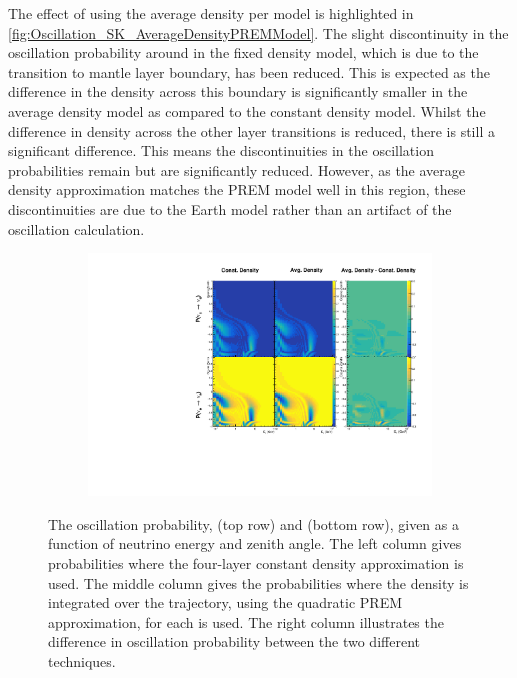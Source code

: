 The effect of using the average density per  model is highlighted in \autoref{fig:Oscillation_SK_AverageDensityPREMModel}. The slight discontinuity in the oscillation probability around  in the fixed density model, which is due to the transition to mantle layer boundary, has been reduced. This is expected as the difference in the density across this boundary is significantly smaller in the average density model as compared to the constant density model. Whilst the difference in density across the other layer transitions is reduced, there is still a significant difference. This means the discontinuities in the oscillation probabilities remain but are significantly reduced. However, as the average density approximation matches the PREM model well in this region, these discontinuities are due to the Earth model rather than an artifact of the oscillation calculation.

\begin{figure}[h]
  \begin{subfigure}[t]{\textwidth}
    \includegraphics[width=\textwidth, trim={0mm 0mm 0mm 0mm}, clip,page=1]{Figures/Oscillation/AverageDensityPREMModel.pdf}
  \end{subfigure}
  \caption{The oscillation probability,  (top row) and  (bottom row), given as a function of neutrino energy and zenith angle. The left column gives probabilities where the four-layer constant density approximation is used. The middle column gives the probabilities where the density is integrated over the trajectory, using the quadratic PREM approximation, for each  is used. The right column illustrates the difference in oscillation probability between the two different techniques.}
  \label{fig:Oscillation_SK_AverageDensityPREMModel}
\end{figure}

